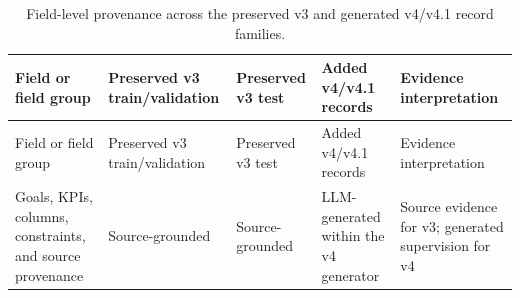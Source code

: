 \begin{landscape}
\begingroup\scriptsize\setlength{\tabcolsep}{3pt}\sloppy
\begin{longtable}[]{@{}
  >{\raggedright\arraybackslash}p{}
  >{\raggedright\arraybackslash}p{}
  >{\raggedright\arraybackslash}p{}
  >{\raggedright\arraybackslash}p{}
  >{\raggedright\arraybackslash}p{}@{}}
\caption{Field-level provenance across the preserved v3 and generated v4/v4.1 record families.}\tabularnewline
\toprule\noalign{}
\begin{minipage}[b]{\linewidth}\raggedright
Field or field group
\end{minipage} & \begin{minipage}[b]{\linewidth}\raggedright
Preserved v3 train/validation
\end{minipage} & \begin{minipage}[b]{\linewidth}\raggedright
Preserved v3 test
\end{minipage} & \begin{minipage}[b]{\linewidth}\raggedright
Added v4/v4.1 records
\end{minipage} & \begin{minipage}[b]{\linewidth}\raggedright
Evidence interpretation
\end{minipage} \\
\midrule\noalign{}
\endfirsthead
\toprule\noalign{}
\begin{minipage}[b]{\linewidth}\raggedright
Field or field group
\end{minipage} & \begin{minipage}[b]{\linewidth}\raggedright
Preserved v3 train/validation
\end{minipage} & \begin{minipage}[b]{\linewidth}\raggedright
Preserved v3 test
\end{minipage} & \begin{minipage}[b]{\linewidth}\raggedright
Added v4/v4.1 records
\end{minipage} & \begin{minipage}[b]{\linewidth}\raggedright
Evidence interpretation
\end{minipage} \\
\midrule\noalign{}
\endhead
\bottomrule\noalign{}
\endlastfoot
Goals, KPIs, columns, constraints, and source provenance & Source-grounded & Source-grounded & LLM-generated within the v4 generator & Source evidence for v3; generated supervision for v4 \\

\end{longtable}
\end{landscape}
